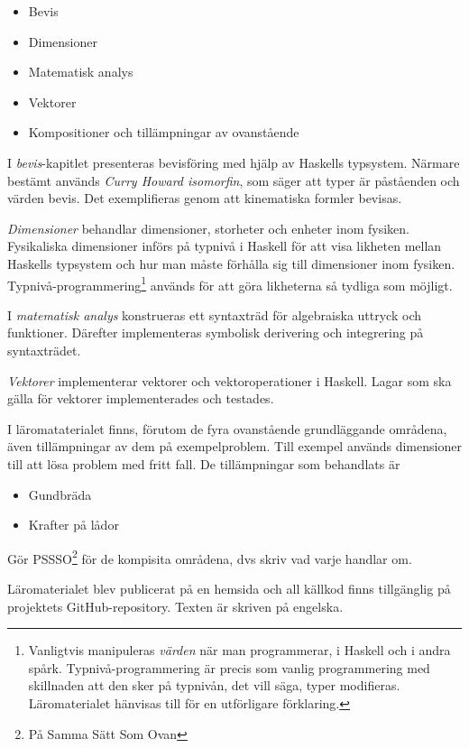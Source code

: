 \begin{draft}
\begin{itemize}
  \item Bevis
  \item Dimensioner
  \item Matematisk analys
  \item Vektorer
  \item Kompositioner och tillämpningar av ovanstående
\end{itemize}

I \textit{bevis}-kapitlet presenteras bevisföring med hjälp av Haskells typsystem. Närmare bestämt används \textit{Curry Howard isomorfin}, som säger att typer är påståenden och värden bevis.\cite{chi} Det exemplifieras genom att kinematiska formler bevisas. 

\textit{Dimensioner} behandlar dimensioner, storheter och enheter inom fysiken. Fysikaliska dimensioner införs på typnivå i Haskell för att visa likheten mellan Haskells typsystem och hur man måste förhålla sig till dimensioner inom fysiken. Typnivå-programmering\footnote{Vanligtvis manipuleras \textit{värden} när man programmerar, i Haskell och i andra spårk. Typnivå-programmering är precis som vanlig programmering med skillnaden att den sker på typnivån, det vill säga, typer modifieras. Läromaterialet \cite{LYAP} hänvisas till för en utförligare förklaring.} används för att göra likheterna så tydliga som möjligt.

I \textit{matematisk analys} konstrueras ett syntaxträd för algebraiska uttryck och funktioner. Därefter implementeras symbolisk derivering och integrering på syntaxträdet.

\textit{Vektorer} implementerar vektorer och vektoroperationer i Haskell. Lagar som ska gälla för vektorer implementerades och testades.

I läromataterialet finns, förutom de fyra ovanstående grundläggande områdena,
även tillämpningar av dem på exempelproblem. Till exempel används dimensioner
till att lösa problem med fritt fall. De tillämpningar som behandlats är

\begin{itemize}
  \item Gundbräda
  \item Krafter på lådor
\end{itemize}

Gör PSSSO\footnote{På Samma Sätt Som Ovan} för de kompisita områdena, dvs skriv vad varje handlar om.

Läromaterialet blev publicerat på en hemsida\cite{LYAP} och all källkod finns
tillgänglig på projektets GitHub-repository.\cite{LYAP_repo} Texten är skriven
på engelska.


\end{draft}
